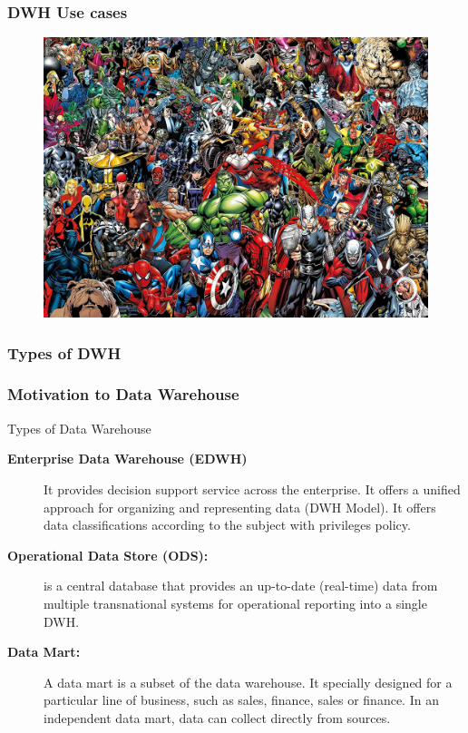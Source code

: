 \begin{frame}
\frametitle{DWH Use cases}
\begin{figure}[ht]

\centering
\includegraphics[width=\linewidth,height=.8\textheight]{./Figures/chapter-01/Marvel-01.jpg}
\end{figure}
\end{frame}

\VideoClassification[column=2, colour=blue]
\subsubsection{Types of DWH}
\begin{frame}
\frametitle{Motivation to Data Warehouse}
Types of Data Warehouse
\begin{description}
\item [\textbf{Enterprise Data Warehouse (EDWH)}] It provides decision support service across the enterprise. It offers a unified approach for organizing and representing data (DWH Model). It offers data classifications according to the subject with privileges policy.
\item [\textbf{Operational Data Store (ODS):}] is a central database that provides an up-to-date (real-time) data from multiple transnational systems for operational reporting into a single DWH.

\item [\textbf{Data Mart:}] A data mart is a subset of the data warehouse. It specially designed for a particular line of business, such as sales, finance, sales or finance. In an independent data mart, data can collect directly from sources.
\end{description}

\end{frame}

